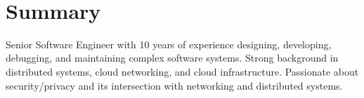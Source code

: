 \documentclass[letterpaper,11pt]{article}
\begin{document}
 \\

\section{Summary}
\begin{flushleft}
Senior Software Engineer with 10 years of experience designing, developing, debugging, and maintaining complex software systems. Strong background in distributed systems, cloud networking, and cloud infrastructure. Passionate about security/privacy and its intersection with networking and distributed systems.
\end{flushleft}

\end{document}

